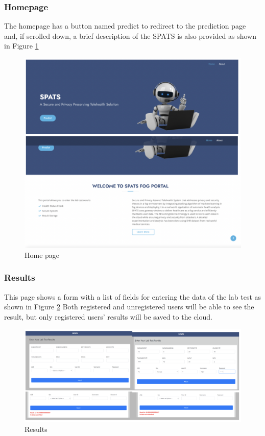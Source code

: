 \documentclass[10pt]{article}
\begin{document}
\subsubsection{Homepage}
The homepage has a button named predict to redirect to the prediction page and, if scrolled down, a brief description of the SPATS is also provided as shown in Figure \ref{fig:8}
\begin{figure}[H]
    \begin{center}
        \includegraphics[width=0.9\linewidth,frame]{CA2-template/RIC9.png}
       \caption{Home page \label{fig:8}}
    \end{center}
\end{figure}

\subsubsection{Results}
This page shows a form with a list of fields for entering the data of the lab test as shown in Figure \ref{fig:9}
Both registered and unregistered users will be able to see the result, but only registered users' results will be saved to the cloud.

\begin{figure}[H]
    \begin{center}
        \includegraphics[width=0.9\linewidth,frame]{CA2-template/RIC10.png}
       \caption{Results \label{fig:9}}
    \end{center}
\end{figure}
\end{document}
